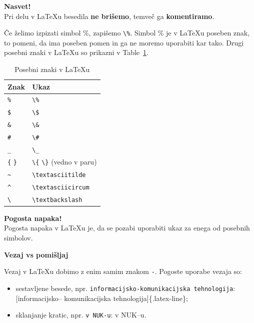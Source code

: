 \begin{framed}
\textbf{Nasvet!}\\
Pri delu v LaTeXu besedila \textbf{ne brišemo}, temveč ga \textbf{komentiramo}.
\end{framed}

Če želimo izpizati simbol \%, zapišemo \texttt{{\textbackslash}\%}.
Simbol \% je v LaTeXu poseben znak, to pomeni, da ima poseben pomen in ga ne moremo uporabiti kar tako.
Drugi posebni znaki v LaTeXu so prikazni v Table~\ref{tab-posebniZnaki}.

\begin{table}
\centering
\caption[]{Posebni znaki v LaTeXu}
\label{tab-posebniZnaki}
\begin{tabular}{p{}p{}}
\toprule
Znak & Ukaz \\
\hline
\texttt{\%} & \texttt{{\textbackslash}\%} \\
\texttt{\$} & \texttt{{\textbackslash}\$} \\
\texttt{\&} & \texttt{{\textbackslash}\&} \\
\texttt{\#} & \texttt{{\textbackslash}\#} \\
\texttt{\_} & \texttt{{\textbackslash}\_} \\
\texttt{\{} \texttt{\}} & \texttt{{\textbackslash}\{} \texttt{{\textbackslash}\}} (vedno v paru) \\
\texttt{{\textasciitilde}} & \texttt{{\textbackslash}textasciitilde} \\
\texttt{\^} & \texttt{{\textbackslash}textasciicircum} \\
\texttt{{\textbackslash}} & \texttt{{\textbackslash}textbackslash} \\
\bottomrule
\end{tabular}
\end{table}

\begin{framed}
\textbf{Pogosta napaka!}\\
Pogosta napaka v LaTeXu je, da se pozabi uporabiti ukaz za enega od posebnih simbolov.
\end{framed}

\textbf{Vezaj vs pomišljaj}

Vezaj v LaTeXu dobimo z enim samim znakom \texttt{-}.
Pogoste uporabe vezaja so:

\begin{itemize}
\item sestavljene besede, npr. \texttt{informacijsko-komunikacijska tehnologija}: [informacijsko-- komunikacijska tehnologija]\{.latex-line\};
\item sklanjanje kratic, npr. \texttt{v NUK-u}: v NUK--u.
\end{itemize}

